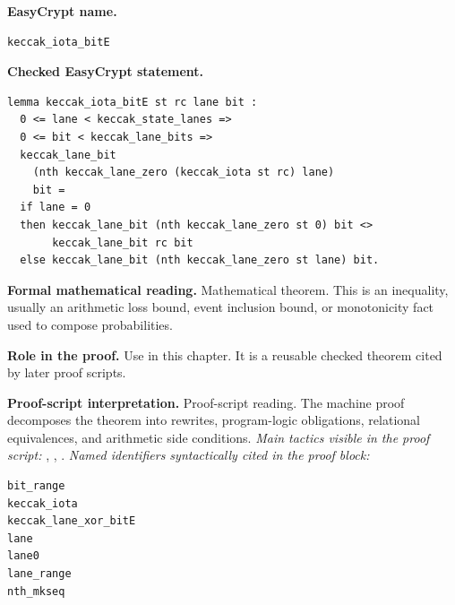 \begin{formaltheorem}
\noindent\textbf{EasyCrypt name.}
\begin{lstlisting}[language=EasyCrypt,basicstyle=\ttfamily\scriptsize]
keccak_iota_bitE
\end{lstlisting}
\noindent\textbf{Checked EasyCrypt statement.}
\begin{lstlisting}[language=EasyCrypt,basicstyle=\ttfamily\scriptsize]
lemma keccak_iota_bitE st rc lane bit :
  0 <= lane < keccak_state_lanes =>
  0 <= bit < keccak_lane_bits =>
  keccak_lane_bit
    (nth keccak_lane_zero (keccak_iota st rc) lane)
    bit =
  if lane = 0
  then keccak_lane_bit (nth keccak_lane_zero st 0) bit <>
       keccak_lane_bit rc bit
  else keccak_lane_bit (nth keccak_lane_zero st lane) bit.
\end{lstlisting}
\noindent\textbf{Formal mathematical reading.}
Mathematical theorem. This is an inequality, usually an arithmetic loss bound, event inclusion bound, or monotonicity fact used to compose probabilities.

\noindent\textbf{Role in the proof.}
Use in this chapter. It is a reusable checked theorem cited by later proof scripts.

\noindent\textbf{Proof-script interpretation.}
Proof-script reading. The machine proof decomposes the theorem into rewrites, program-logic obligations, relational equivalences, and arithmetic side conditions.
\emph{Main tactics visible in the proof script:} , , .
\emph{Named identifiers syntactically cited in the proof block:}
\begin{lstlisting}[language=EasyCrypt,basicstyle=\ttfamily\scriptsize]
bit_range
keccak_iota
keccak_lane_xor_bitE
lane
lane0
lane_range
nth_mkseq
\end{lstlisting}

\end{formaltheorem}

